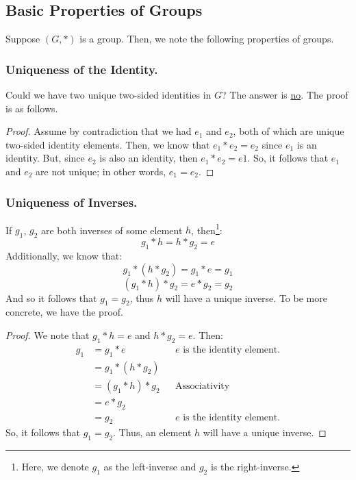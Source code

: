 \documentclass[letterpaper]{article}
\begin{document}
\subsection{Basic Properties of Groups}
Suppose $(G, *)$ is a group. Then, we note the following properties of groups. 

\subsubsection{Uniqueness of the Identity.} 
Could we have two unique two-sided identities in $G$? The answer is \underline{no}. The proof is as follows. 

\begin{mdframed}
    \begin{proof}
        Assume by contradiction that we had $e_1$ and $e_2$, both of which are unique two-sided identity elements. Then, we know that $e_1 * e_2 = e_2$ since $e_1$ is an identity. But, since $e_2$ is also an identity, then $e_1 * e_2 = e1$. So, it follows that $e_1$ and $e_2$ are not unique; in other words, $e_1 = e_2$. 
    \end{proof}
\end{mdframed}

\subsubsection{Uniqueness of Inverses.}

If $g_1$, $g_2$ are both inverses of some element $h$, then\footnote{Here, we denote $g_1$ as the left-inverse and $g_2$ is the right-inverse.}:
\[g_1 * h = h * g_2 = e\]
Additionally, we know that:
\[g_1 * (h * g_2) = g_1 * e = g_1\]
\[(g_1 * h) * g_2 = e * g_2 = g_2\]
And so it follows that $g_1 = g_2$, thus $h$ will have a unique inverse. To be more concrete, we have the proof. 
\begin{mdframed}
    \begin{proof}
        We note that $g_1 * h = e$ and $h * g_2 = e$. Then:
        \begin{equation*}
            \begin{aligned}
                g_1 &= g_1 * e && e \text{ is the identity element.} \\ 
                    &= g_1 * (h * g_2) \\ 
                    &= (g_1 * h) * g_2 && \text{Associativity} \\ 
                    &= e * g_2 \\ 
                    &= g_2 && e \text{ is the identity element.}
            \end{aligned}
        \end{equation*}
        So, it follows that $g_1 = g_2$. Thus, an element $h$ will have a unique inverse. 
    \end{proof}
\end{mdframed}
\end{document}

